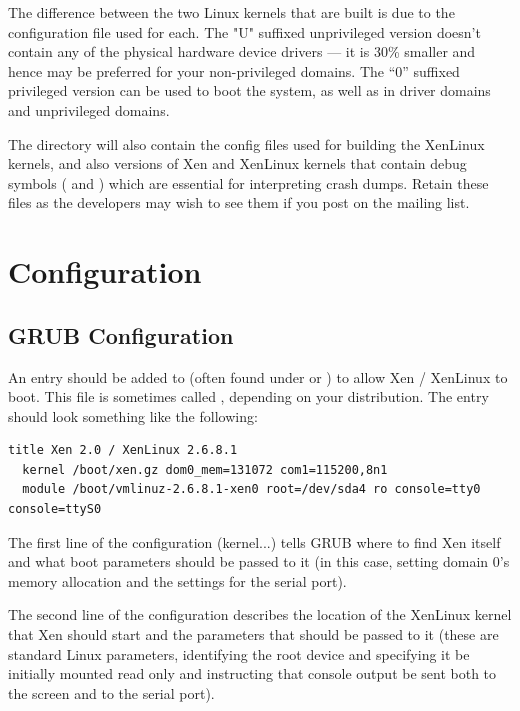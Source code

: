 \documentclass[11pt,twoside,final,openright]{xenstyle}
\begin{document}
The difference between the two Linux kernels that are built is due to
the configuration file used for each.  The "U" suffixed unprivileged
version doesn't contain any of the physical hardware device drivers
--- it is 30\% smaller and hence may be preferred for your
non-privileged domains.  The ``0'' suffixed privileged version can be
used to boot the system, as well as in driver domains and unprivileged
domains.

The  directory will also contain the config files
used for building the XenLinux kernels, and also versions of Xen and
XenLinux kernels that contain debug symbols ( and
) which are essential for interpreting crash
dumps.  Retain these files as the developers may wish to see them if
you post on the mailing list.

\section{Configuration}

\subsection{GRUB Configuration}

An entry should be added to  (often found under
 or ) to allow Xen / XenLinux to boot.
This file is sometimes called , depending on your
distribution.  The entry should look something like the following:

\begin{verbatim}
title Xen 2.0 / XenLinux 2.6.8.1
  kernel /boot/xen.gz dom0_mem=131072 com1=115200,8n1
  module /boot/vmlinuz-2.6.8.1-xen0 root=/dev/sda4 ro console=tty0 console=ttyS0
\end{verbatim}

The first line of the configuration (kernel...) tells GRUB where to
find Xen itself and what boot parameters should be passed to it (in
this case, setting domain 0's memory allocation and the settings for
the serial port).

The second line of the configuration describes the location of the
XenLinux kernel that Xen should start and the parameters that should
be passed to it (these are standard Linux parameters, identifying the
root device and specifying it be initially mounted read only and
instructing that console output be sent both to the screen and to the
serial port).
\end{document}

